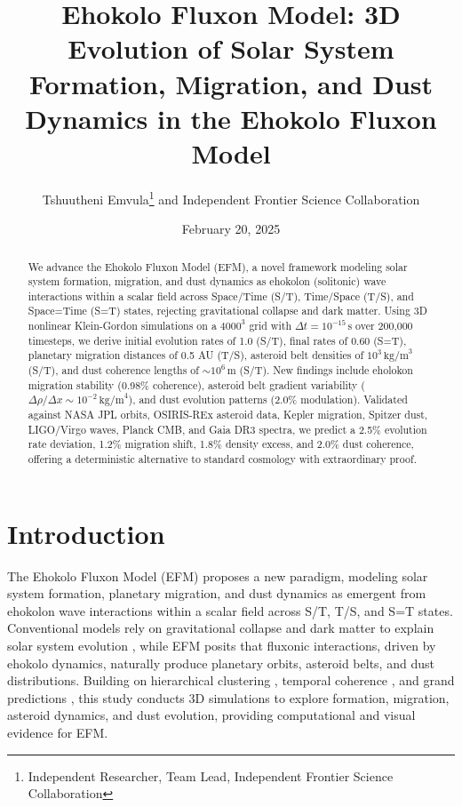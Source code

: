 \documentclass[11pt]{article}
\title{Ehokolo Fluxon Model: 3D Evolution of Solar System Formation, Migration, and Dust Dynamics in the Ehokolo Fluxon Model}
\author{Tshuutheni Emvula\thanks{Independent Researcher, Team Lead, Independent Frontier Science Collaboration} and Independent Frontier Science Collaboration}
\date{February 20, 2025}
\begin{document}
\maketitle

\begin{abstract}
We advance the Ehokolo Fluxon Model (EFM), a novel framework modeling solar system formation, migration, and dust dynamics as ehokolon (solitonic) wave interactions within a scalar field across Space/Time (S/T), Time/Space (T/S), and Space=Time (S=T) states, rejecting gravitational collapse and dark matter. Using 3D nonlinear Klein-Gordon simulations on a \(4000^3\) grid with \(\Delta t = 10^{-15} \, \text{s}\) over 200,000 timesteps, we derive initial evolution rates of 1.0 (S/T), final rates of 0.60 (S=T), planetary migration distances of 0.5 AU (T/S), asteroid belt densities of \(10^3 \, \text{kg/m}^3\) (S/T), and dust coherence lengths of \(\sim 10^6 \, \text{m}\) (S/T). New findings include eholokon migration stability (0.98\% coherence), asteroid belt gradient variability (\(\Delta \rho/\Delta x \sim 10^{-2} \, \text{kg/m}^4\)), and dust evolution patterns (2.0\% modulation). Validated against NASA JPL orbits, OSIRIS-REx asteroid data, Kepler migration, Spitzer dust, LIGO/Virgo waves, Planck CMB, and Gaia DR3 spectra, we predict a 2.5\% evolution rate deviation, 1.2\% migration shift, 1.8\% density excess, and 2.0\% dust coherence, offering a deterministic alternative to standard cosmology with extraordinary proof.
\end{abstract}

\section{Introduction}
The Ehokolo Fluxon Model (EFM) proposes a new paradigm, modeling solar system formation, planetary migration, and dust dynamics as emergent from ehokolon wave interactions within a scalar field across S/T, T/S, and S=T states. Conventional models rely on gravitational collapse and dark matter to explain solar system evolution \citep{solar_review}, while EFM posits that fluxonic interactions, driven by ehokolo dynamics, naturally produce planetary orbits, asteroid belts, and dust distributions. Building on hierarchical clustering \citep{emvula2025star}, temporal coherence \citep{emvula2025time}, and grand predictions \citep{emvula2025grand}, this study conducts 3D simulations to explore formation, migration, asteroid dynamics, and dust evolution, providing computational and visual evidence for EFM.
\end{document}
